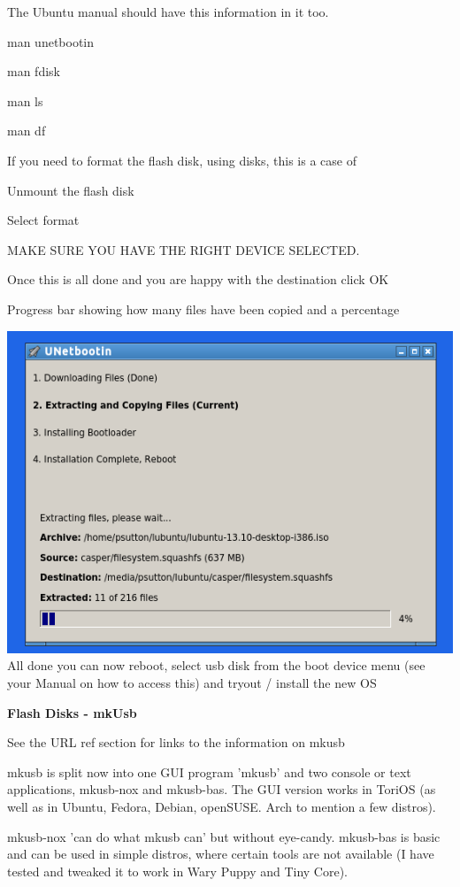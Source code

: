 \documentclass[12pt,a4paper]{book}
\begin{document}
The Ubuntu manual should have this information in it too.

man unetbootin

man fdisk

man ls

man df

If you need to format the flash disk, using disks, this is a case of

Unmount the flash disk

Select format

MAKE SURE YOU HAVE THE RIGHT DEVICE SELECTED.

Once this is all done and you are happy with the destination click OK

Progress bar showing how many files have been copied and a percentage


\includegraphics[width=0.7\linewidth]{screen-shots/unetbootin5} \\

All done you can now reboot, select usb disk from the boot device menu (see your Manual on how to access this) and tryout /  install the new OS


\textbf{Flash Disks - mkUsb}

See the URL ref section for links to the information on mkusb \cite{mkUSB-Quick-Start-manual}

mkusb is split now into one GUI program 'mkusb' and two console or text
applications, mkusb-nox and mkusb-bas. The GUI version works in ToriOS
(as well as in Ubuntu, Fedora, Debian, openSUSE. Arch to mention a few
distros).

mkusb-nox 'can do what mkusb can' but without eye-candy. mkusb-bas is
basic and can be used in simple distros, where certain tools are not
available (I have tested and tweaked it to work in Wary Puppy and Tiny
Core).
\end{document}
